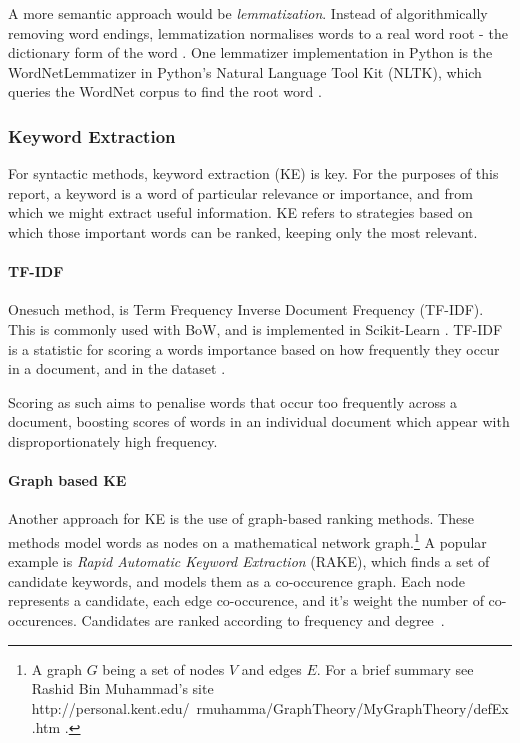 A more semantic approach would be \emph{lemmatization}. Instead of algorithmically removing word endings, lemmatization 
normalises words to a real word root - the dictionary
form of the word \cite{Jayakodi2016}.  One lemmatizer implementation in Python is the WordNetLemmatizer in Python's
Natural Language Tool Kit (NLTK), which queries the WordNet corpus to find the root word 
\cite{StevenBirdEwanKlein2009, princetonuniversity_2010}. 
 
\subsubsection{Keyword Extraction}\label{sssec:kwe}
For syntactic methods, keyword extraction (KE) is key.  For the purposes of this report, a keyword is a word of particular
relevance or importance, and from which we might extract useful information.  KE refers to strategies
based on which those important words can be ranked, keeping only the most relevant.

\paragraph{TF-IDF}\label{ssec:tfidf}

Onesuch method, is Term Frequency Inverse Document Frequency (TF-IDF). This is commonly used with BoW, and is 
implemented in Scikit-Learn \cite{Barupal2011}.  TF-IDF is a statistic for scoring a words importance based on
how frequently they occur in a document, and in the dataset \cite{Ramos2003}.

Scoring as such aims to penalise words that occur too frequently across a document, boosting scores of words in an 
individual document which appear with disproportionately high frequency.

\paragraph{Graph based KE}\label{sssec:gbkwe}

Another approach for KE is the use of graph-based ranking methods.  These methods model words as
nodes on a mathematical network graph.\footnote{A graph $G$ being a set of nodes $V$ and edges $E$.  For a brief 
summary see Rashid Bin Muhammad's site http://personal.kent.edu/~rmuhamma/GraphTheory/MyGraphTheory/defEx.htm
\cite{muhammad}.}  A popular example is \emph{Rapid Automatic Keyword Extraction} (RAKE), which
finds a set of candidate keywords, and models them as a co-occurence graph.  
Each node represents a candidate, each edge co-occurence, and it's weight the number of co-occurences.  
Candidates are ranked according to frequency and degree~\cite{Rose2010}.

